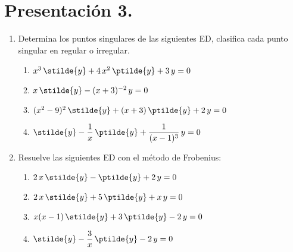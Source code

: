 \section{Presentación 3.}
\begin{enumerate}
\item Determina los puntos singulares de las siguientes ED, clasifica cada punto singular en regular o irregular.
\begin{enumerate}
\item $x^{3} \, \stilde{y} + 4 \, x^{2} \, \ptilde{y} + 3 \, y = 0$
\item $x \, \stilde{y} - (x + 3)^{-2} \, y = 0$
\item $(x^{2} - 9)^{2} \, \stilde{y} + (x + 3) \, \ptilde{y} + 2 \, y = 0$
\item $\stilde{y} - \dfrac{1}{x} \, \ptilde{y} + \dfrac{1}{(x - 1)^{3}} \, y = 0$
\end{enumerate}
\item Resuelve las siguientes ED con el método de Frobenius:
\begin{enumerate}
\item $2 \, x \, \stilde{y} - \ptilde{y} + 2 \, y = 0$
\item $2 \, x \, \stilde{y} + 5 \, \ptilde{y} + x \, y = 0$
\item $x (x - 1) \, \stilde{y} + 3 \, \ptilde{y} - 2 \, y = 0$
\item $\stilde{y} - \dfrac{3}{x} \, \ptilde{y} - 2 \, y = 0$
\end{enumerate}
\end{enumerate}
